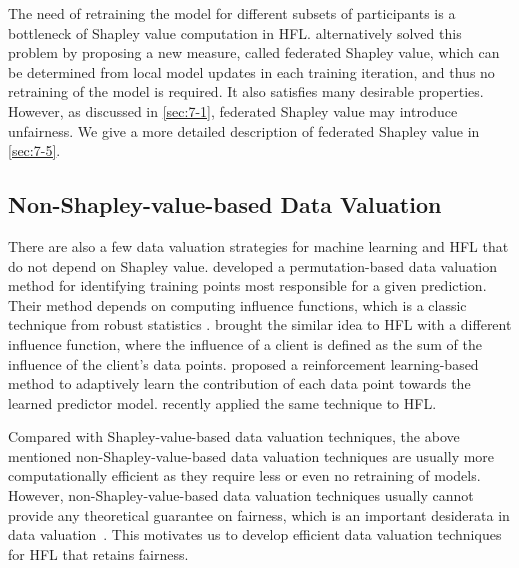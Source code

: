 The need of retraining the model for different subsets of participants is a bottleneck of Shapley value computation in HFL. \citet{wang2020principled} alternatively solved this problem by proposing a new measure, called federated Shapley value, which can be determined from local model updates in each training iteration, and thus no retraining of the model is required. It also satisfies many desirable properties. However, as discussed in \autoref{sec:7-1}, federated Shapley value may introduce unfairness. We give a more detailed description of federated Shapley value in \autoref{sec:7-5}. 

\subsection{Non-Shapley-value-based Data Valuation}
There are also a few data valuation strategies for machine learning and HFL that do not depend on Shapley value. \citet{koh2017understanding} developed a permutation-based data valuation method for identifying training points most responsible for a given prediction. Their method depends on computing influence functions, which is a classic technique from robust statistics \citep{hampel1974influence}. \citet{wang2019measure} brought the similar idea to HFL with a different influence function, where the influence of a client is defined as the sum of the influence of the client's data points. \citet{yoon2020data} proposed a reinforcement learning-based method to adaptively learn the contribution of each data point towards the learned predictor model. \citet{zhao2021efficient} recently applied the same technique to HFL. 

Compared with Shapley-value-based data valuation techniques, the above mentioned non-Shapley-value-based data valuation techniques are usually more computationally efficient as they require less or even no retraining of models. However, non-Shapley-value-based data valuation techniques usually cannot provide any theoretical guarantee on fairness, which is an important desiderata in data valuation~\citep{ghorbani2019data, pei2020survey}. This motivates us to develop efficient data valuation techniques for HFL that retains fairness. 

